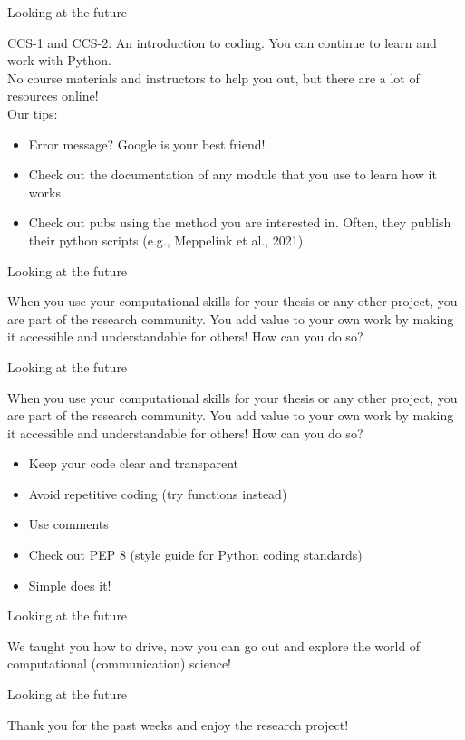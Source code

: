 \documentclass[handout]{beamer}
\begin{document}
\begin{frame}{Looking at the future} 
	
CCS-1 and CCS-2: An introduction to coding. You can continue to learn and work with Python.\\
No course materials and instructors to help you out, but there are a lot of resources online!\\
Our tips:
	\begin{itemize}
		\item Error message? Google is your best friend!
		\item Check out the documentation of any module that you use to learn how it works
		\item Check out pubs using the method you are interested in. Often, they publish their python scripts (e.g., Meppelink et al., 2021)
	\end{itemize}
	
\end{frame}


\begin{frame}{Looking at the future} 
	
When you use your computational skills for your thesis or any other project, you are part of the research community. You add value to your own work by making it accessible and understandable for others! How can you do so?
	
\end{frame}



\begin{frame}{Looking at the future} 
	
	When you use your computational skills for your thesis or any other project, you are part of the research community. You add value to your own work by making it accessible and understandable for others! How can you do so?
	\begin{itemize}
		\item Keep your code clear and transparent
		\item Avoid repetitive coding (try functions instead)
		\item Use comments 
		\item Check out PEP 8 (style guide for Python coding standards)
		\item Simple does it!
	\end{itemize}
	
\end{frame}


\begin{frame}{Looking at the future} 
	
We taught you how to drive, now you can go out and explore the world of computational (communication) science!
	
\end{frame}


\begin{frame}{Looking at the future} 
	
Thank you for the past weeks and enjoy the research project!

\end{frame}
\end{document}
